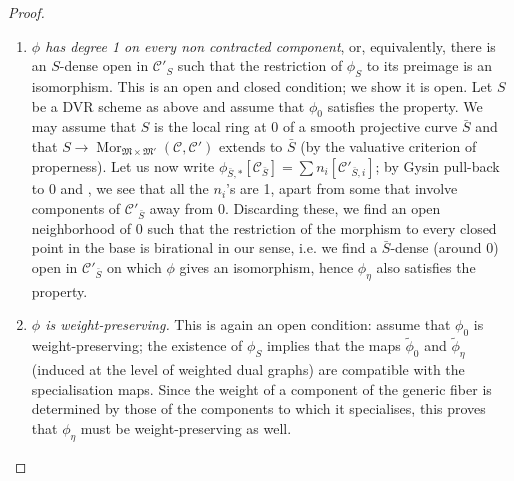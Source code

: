 \documentclass[11pt]{amsart}
\renewcommand{\to}{\rightarrow}
\theoremstyle{plain}
\theoremstyle{definition}
\begin{document}
\begin{proof}
\begin{description}[labelindent=0cm,leftmargin=\parindent]
\begin{enumerate}
\item\emph{$\phi$ has degree 1 on every non contracted component}, or, equivalently, there is an $S$-dense open in $\mathcal C'_S$ such that the restriction of $\phi_S$ to its preimage is an isomorphism.
This is an open and closed condition; we show it is open. Let $S$ be a DVR scheme as above and assume that $\phi_0$ satisfies the property. We may assume that $S$ is the local ring at $0$ of a smooth projective curve $\bar S$ \cite[Thm. I.6.9]{HAR} and that $S\to\operatorname{Mor}_{\mathfrak{M}\times\mathfrak{M}'}(\mathcal C,\mathcal C')$ extends to $\bar S$ (by the valuative criterion of properness).  Let us now write $\phi_{\bar S,*}[\mathcal C_{\bar S}]=\sum n_i[\mathcal C'_{\bar S,i}]$; by Gysin pull-back to $0$ and \cite[Prop. 10.1(a)]{FUL}, we see that all the $n_i$'s are 1, apart from some that involve components of $\mathcal C'_{\bar S}$ away from $0$. Discarding these, we find an open neighborhood of $0$ such that the restriction of the morphism to every closed point in the base is birational in our sense, i.e. we find a $\bar S$-dense (around $0$) open in $\mathcal C'_{\bar S}$ on which $\phi$ gives an isomorphism, hence $\phi_\eta$ also satisfies the property.

\item\emph{$\phi$ is weight-preserving.} This is again an open condition: assume that $\phi_0$ is weight-preserving; the existence of $\phi_S$ implies that the maps $\tilde \phi_0$ and $\tilde\phi_\eta$ (induced at the level of weighted dual graphs) are compatible with the specialisation maps. Since the weight of a component of the generic fiber is determined by those of the components to which it specialises, this proves that $\phi_\eta$ must be weight-preserving as well.
\end{enumerate}


\end{description}
\end{proof}
\end{document}
